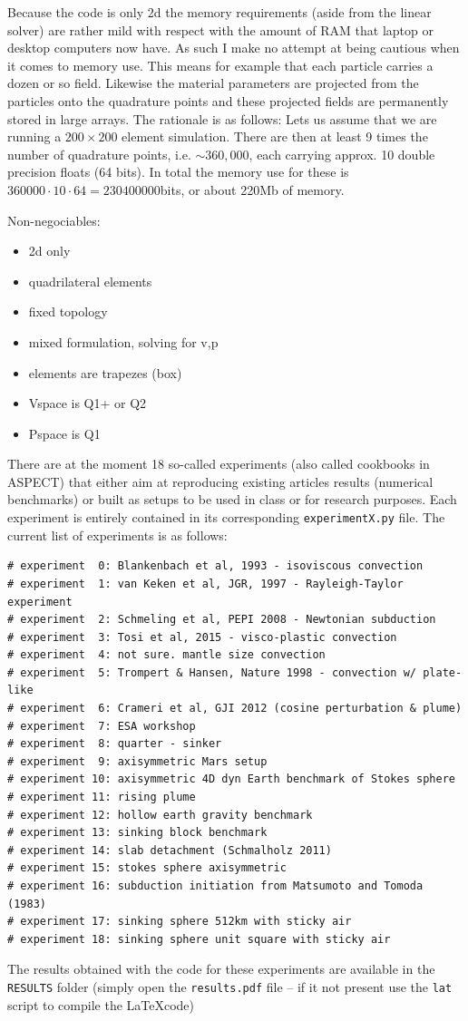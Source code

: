 \documentclass[a4paper,12pt]{article}
\begin{document}
Because the code is only 2d the memory requirements (aside from the linear solver)
are rather mild with respect with the amount of RAM that laptop or desktop computers now have.
As such I make no attempt at being cautious when it comes to memory use.
This means for example that each particle carries a dozen or so field. 
Likewise the material parameters are projected from the particles onto the 
quadrature points and these projected fields are permanently stored in large arrays.
The rationale is as follows: Lets us assume that we are running a $200\times 200$
element simulation. There are then at least 9 times the number of quadrature points, 
i.e. $\sim 360,000$, each carrying approx. 10 double precision floats (64 bits). 
In total the memory use for these is $360000 \cdot 10 \cdot 64 = 230400000$bits, 
or about 220Mb of memory.

Non-negociables:
\begin{itemize}
\item 2d only
\item quadrilateral elements
\item fixed topology
\item mixed formulation, solving for v,p
\item elements are trapezes (box)
\item Vspace is Q1+ or Q2
\item Pspace is Q1
\end{itemize}


There are at the moment 18 so-called experiments (also called cookbooks in ASPECT)
that either aim at reproducing existing articles results (numerical benchmarks)
or built as setups to be used in class or for research purposes.
Each experiment is entirely contained in its corresponding \lstinline{experimentX.py} file.
The current list of experiments is as follows:
\begin{lstlisting}  
# experiment  0: Blankenbach et al, 1993 - isoviscous convection
# experiment  1: van Keken et al, JGR, 1997 - Rayleigh-Taylor experiment
# experiment  2: Schmeling et al, PEPI 2008 - Newtonian subduction
# experiment  3: Tosi et al, 2015 - visco-plastic convection
# experiment  4: not sure. mantle size convection
# experiment  5: Trompert & Hansen, Nature 1998 - convection w/ plate-like  
# experiment  6: Crameri et al, GJI 2012 (cosine perturbation & plume) 
# experiment  7: ESA workshop
# experiment  8: quarter - sinker
# experiment  9: axisymmetric Mars setup
# experiment 10: axisymmetric 4D dyn Earth benchmark of Stokes sphere
# experiment 11: rising plume 
# experiment 12: hollow earth gravity benchmark 
# experiment 13: sinking block benchmark
# experiment 14: slab detachment (Schmalholz 2011)
# experiment 15: stokes sphere axisymmetric 
# experiment 16: subduction initiation from Matsumoto and Tomoda (1983)
# experiment 17: sinking sphere 512km with sticky air
# experiment 18: sinking sphere unit square with sticky air 
\end{lstlisting}  
The results obtained with the code for these experiments are 
available in the {\tt RESULTS} folder (simply open the {\tt results.pdf} file
-- if it not present use the {\tt lat} script to compile the \LaTeX code)
\end{document}
